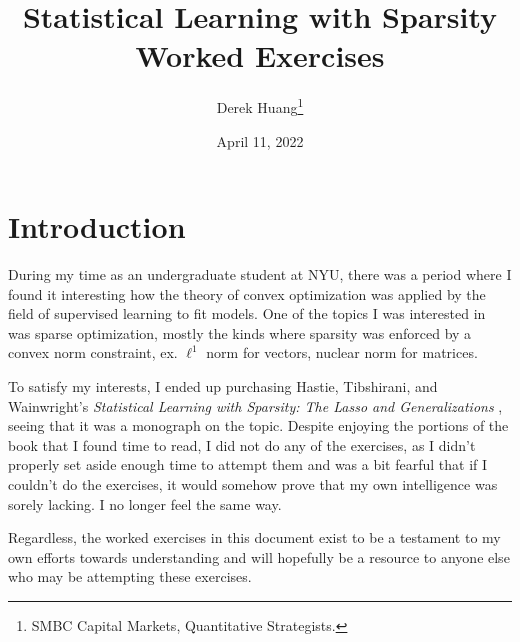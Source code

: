 \documentclass{article}
\title{Statistical Learning with Sparsity \\ \Large Worked Exercises}
\author{Derek Huang\thanks{SMBC Capital Markets, Quantitative Strategists.}}
\date{April 11, 2022}
\numberwithin{equation}{section}
\begin{document}
\newcommand{\newtocsubsection}[1]{%
    \subsection*{#1} \addcontentsline{toc}{subsection}{#1}%
}

\maketitle


\tableofcontents

\newpage

\section{Introduction}

During my time as an undergraduate student at NYU, there was a period where
I found it interesting how the theory of convex optimization was applied by
the field of supervised learning to fit models. One of the topics I was
interested in was sparse optimization, mostly the kinds where sparsity was
enforced by a convex norm constraint, ex. $ \ell^1 $ norm for vectors,
nuclear norm for matrices.

\medskip

To satisfy my interests, I ended up purchasing Hastie, Tibshirani, and
Wainwright's \textit{%
    Statistical Learning with Sparsity: The Lasso and Generalizations%
}, seeing that it was a monograph on the topic. Despite enjoying the portions
of the book that I found time to read, I did not do any of the exercises,
as I didn't properly set aside enough time to attempt them and was a bit fearful that if I couldn't do the exercises, it would somehow prove that my own intelligence was sorely lacking. I no longer feel the same way.

\medskip

Regardless, the worked exercises in this document exist to be a testament
to my own efforts towards understanding and will hopefully be a resource to
anyone else who may be attempting these exercises.

\medskip

\end{document}
